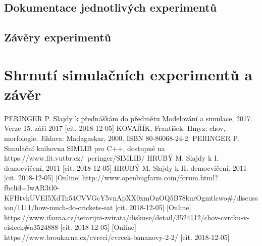 \documentclass{article}
\begin{document}
    \subsection{Dokumentace jednotlivých experimentů}

    \subsection{Závěry experimentů}

    \section{Shrnutí simulačních experimentů a závěr}





    \begin{thebibliography}{zdroje}
         \label{ims} PERINGER P. Slajdy k přednáškám do předmětu Modelování a simulace, 2017. Verze 15. září 2017 [cit. 2018-12-05]
         \label{kniha} KOVAŘÍK, František. Hmyz: chov, morfologie. Jihlava: Madagaskar, 2000. ISBN 80-86068-24-2.
         \label{simlib} PERINGER P. Simulační knihovna SIMLIB pro C++, dostupné na https://www.fit.vutbr.cz/~peringer/SIMLIB/
         \label{prvnidemo} HRUBÝ M. Slajdy k I. democvičení, 2011 [cit. 2018-12-05]
         \label{druhedemo} HRUBÝ M. Slajdy k II. democvičení, 2011 [cit. 2018-12-05]
         \label{jidlo} [Online] http://www.openbugfarm.com/forum.html?fbclid=IwAR3tl0-KFHtvkUVEI5XdTn54CVVGcY5vnApXX0xmOnOQ5B78kurOgmtlcwo#/discussion/1111/how-much-do-crickets-eat [cit. 2018-12-05]
         \label{forum} [Online] https://www.ifauna.cz/terarijni-zvirata/diskuse/detail/3524112/chov-cvrcku-v-cislech#a3524888 [cit. 2018-12-05]
         \label{cena} [Online] https://www.broukarna.cz/cvrcci/cvrcek-bananovy-2-2/ [cit. 2018-12-05]
    \end{thebibliography}
\end{document}
